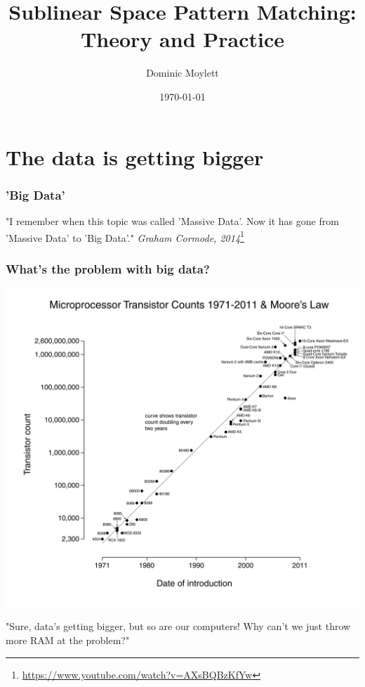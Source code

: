 \documentclass{beamer}
\title[Sublinear Space Pattern Matching]{Sublinear Space Pattern Matching: Theory and Practice} %
\author{Dominic Moylett} %
\institute[University of Bristol] %
{
University of Bristol \\ %
\medskip
\textit{dominic.moylett.2011@my.bristol.ac.uk} %
}
\date{\today} %
\begin{document}
\begin{frame}
\titlepage %
\end{frame}


\section{The data is getting bigger}

\begin{frame}
\frametitle{'Big Data'}
"I remember when this topic was called 'Massive Data'. Now it has gone from 'Massive Data' to 'Big Data'."
\textit{Graham Cormode, 2014}\footnote{\url{https://www.youtube.com/watch?v=AXsBQBzKfYw}}
\end{frame}


\begin{frame}
\frametitle{What's the problem with big data?}
\begin{center}
\includegraphics[width=0.5\paperwidth]{moores_law}
\end{center}
"Sure, data's getting bigger, but so are our computers! Why can't we just throw more RAM at the problem?"
\end{frame}
\end{document}

